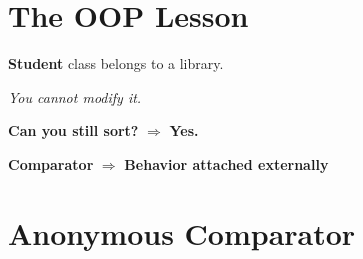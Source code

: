 \documentclass[11pt,a4paper]{book}
\begin{document}















\section{The OOP Lesson}

\begin{center}
\textbf{\textcolor{RosettaBlue}{Student}} class belongs to a library.

\emph{You cannot modify it.}

\vspace{0.8em}

\textbf{Can you still sort?}
\;$\Longrightarrow$\;
\textbf{\textcolor{RosettaJade}{Yes}.}

\vspace{0.8em}

\textbf{\textcolor{RosettaRoyalPurple}{Comparator}}
\;$\Longrightarrow$\;
\textbf{\textcolor{RosettaOrange}{Behavior attached externally}}
\end{center}

\section{Anonymous Comparator}
\end{document}
